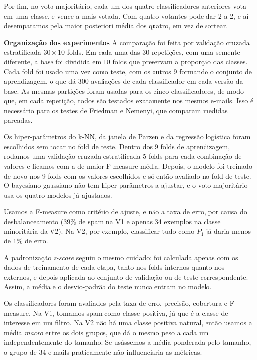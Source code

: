 \documentclass[12pt,reqno]{amsart}
\begin{document}
Por fim, no voto majoritário, cada um dos quatro classificadores anteriores vota em uma classe, e
vence a mais votada. Com quatro votantes pode dar 2 a 2, e aí desempatamos pela maior posteriori
média dos quatro, em vez de sortear.

\noindent \textbf{Organização dos experimentos}
A comparação foi feita por validação cruzada estratificada $30\times10$-folds. Em cada uma das 30
repetições, com uma semente diferente, a base foi dividida em 10 folds que preservam a proporção
das classes. Cada fold foi usado uma vez como teste, com os outros 9 formando o conjunto de
aprendizagem, o que dá 300 avaliações de cada classificador em cada versão da base. As mesmas
partições foram usadas para os cinco classificadores, de modo que, em cada repetição, todos são
testados exatamente nos mesmos e-mails. Isso é necessário para os testes de Friedman e Nemenyi,
que comparam medidas pareadas.

Os hiper-parâmetros do k-NN, da janela de Parzen e da regressão logística foram escolhidos sem
tocar no fold de teste. Dentro dos 9 folds de aprendizagem, rodamos uma validação cruzada
estratificada 5-folds para cada combinação de valores e ficamos com a de maior F-measure média.
Depois, o modelo foi treinado de novo nos 9 folds com os valores escolhidos e só então avaliado
no fold de teste. O bayesiano gaussiano não tem hiper-parâmetros a ajustar, e o voto majoritário
usa os quatro modelos já ajustados.

Usamos a F-measure como critério de ajuste, e não a taxa de erro, por causa do desbalanceamento
(39\% de spam na V1 e apenas 34 exemplos na classe minoritária da V2). Na V2, por exemplo,
classificar tudo como $P_1$ já daria menos de 1\% de erro.

A padronização \emph{z-score} seguiu o mesmo cuidado: foi calculada apenas com os dados de
treinamento de cada etapa, tanto nos folds internos quanto nos externos, e depois aplicada ao
conjunto de validação ou de teste correspondente. Assim, a média e o desvio-padrão do teste nunca
entram no modelo.

Os classificadores foram avaliados pela taxa de erro, precisão, cobertura e F-measure. Na V1,
tomamos spam como classe positiva, já que é a classe de interesse em um filtro. Na V2 não há uma
classe positiva natural, então usamos a média \emph{macro} entre os dois grupos, que dá o mesmo
peso a cada um independentemente do tamanho. Se usássemos a média ponderada pelo tamanho, o grupo
de 34 e-mails praticamente não influenciaria as métricas.
\end{document}
